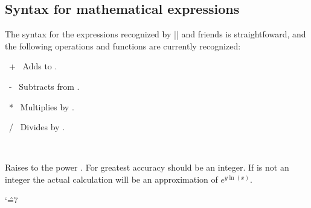 \subsection{Syntax for mathematical expressions}

\label{pgfmath-syntax}

The syntax for the expressions recognized by |\pgfmathparse| and
friends is straightfoward, and the following operations and 
functions are currently recognized:

\begin{math-operator}{\ +\ }
	Adds  to .
	
\begin{codeexample}[]
 \pgfmathresult
\end{codeexample}
\end{math-operator}

\begin{math-operator}{\ -\ }
	Subtracts  from  .
	
\begin{codeexample}[]
 \pgfmathresult
\end{codeexample}
\end{math-operator}
\begin{math-operator}{\ *\ }
	Multiplies  by  .
	
\begin{codeexample}[]
 \pgfmathresult
\end{codeexample}

\end{math-operator}
\begin{math-operator}{\ /\ }
	Divides  by  .
	
\begin{codeexample}[]
 \pgfmathresult
\end{codeexample}

\end{math-operator}
\begin{math-operator}{\ {}\ } 

Raises  to the power . For greatest accuracy 
should be an integer. If  is not an integer the actual
calculation will be an approximation of $e^{y\ln(x)}$.

{
\catcode`\^=7

\begin{codeexample}[]
 \pgfmathresult
\end{codeexample}

\begin{codeexample}[]
 \pgfmathresult
\end{codeexample}
}
\end{math-operator}

